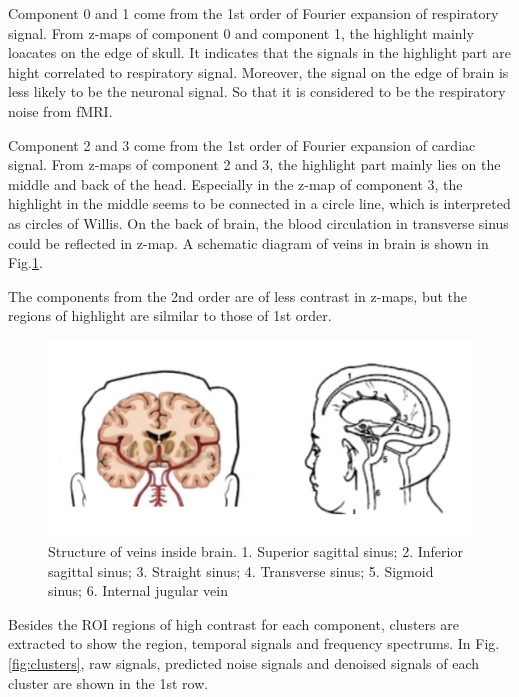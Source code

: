 Component 0 and 1 come from the 1st order of Fourier expansion of respiratory signal.
From z-maps of component 0 and component 1, the highlight mainly loacates on the edge of skull. 
It indicates that the signals in the highlight part are hight correlated to respiratory signal. Moreover,
the signal on the edge of brain is less likely to be the neuronal signal. So that it is considered to be
the respiratory noise from fMRI.

Component 2 and 3 come from the 1st order of Fourier expansion of cardiac signal.
From z-maps of component 2 and 3, the highlight part mainly lies on the middle and back of the head.
Especially in the z-map of component 3, the highlight in the middle seems to be connected in a circle line, which is 
interpreted as circles of Willis. On the back of brain, the blood circulation in transverse sinus
could be reflected in z-map. A schematic diagram of veins in brain is shown in Fig.\ref{fig:brain}.

The components from the 2nd order are of less contrast in z-maps, but the regions of highlight
are silmilar to those of 1st order.

\begin{figure}[htp]
  \centering
  \includegraphics[width=\columnwidth]{Figures/brain.jpeg}
  \caption{Structure of veins inside brain. 1. Superior sagittal sinus; 2. Inferior sagittal sinus;
  3. Straight sinus; 4. Transverse sinus; 5. Sigmoid sinus; 6. Internal jugular vein   }
  \label{fig:brain}
\end{figure} 

Besides the ROI regions of high contrast for each component, clusters are extracted to show the region,
temporal signals and frequency spectrums. In Fig.\ref{fig:clusters}, raw signals, predicted noise signals and 
denoised signals of each cluster are shown in the 1st row.




